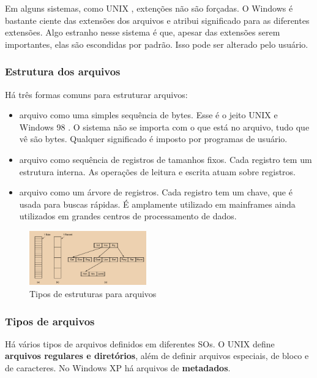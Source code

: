 \documentclass{article}
\newcommand\unix{{\color{red}UNIX} }
\newcommand\winxp{{\color{blue}Windows XP} }
\newcommand\winnoveoito{{\color{pink}Windows 98} }
\begin{document}
Em alguns sistemas, como \unix, extenções não são forçadas. O Windows é bastante ciente das extensões dos arquivos e atribui significado para as diferentes extensões. Algo estranho nesse sistema é que, apesar das extensões serem importantes, elas são escondidas por padrão. Isso pode ser alterado pelo usuário.

\subsubsection{Estrutura dos arquivos}
Há três formas comuns para estruturar arquivos:
\begin{itemize}

    \item arquivo como uma simples sequência de bytes. Esse é o jeito \unix e \winnoveoito. O sistema não se importa com o que está no arquivo, tudo que vê são bytes. Qualquer significado é imposto por programas de usuário.  
  \item arquivo como sequência de registros de tamanhos fixos. Cada registro tem um estrutura interna. As operações de leitura e escrita atuam sobre registros.
  \item arquivo como um árvore de registros. Cada registro tem um chave, que é usada para buscas rápidas. É amplamente utilizado em mainframes ainda utilizados em grandes centros de processamento de dados.

\end{itemize}

\begin{figure}[h!]
  \begin{center}
    \includegraphics[width=0.45\textwidth]{img/5-2.png}
  \end{center}
  \caption{Tipos de estruturas para arquivos}
  \label{fig:}
\end{figure}

\subsubsection{Tipos de arquivos}
Há vários tipos de arquivos definidos em diferentes SOs. O \unix define \textbf{arquivos regulares e diretórios}, além de definir arquivos especiais, de bloco e de caracteres. No \winxp há arquivos de \textbf{metadados}.
\end{document}
